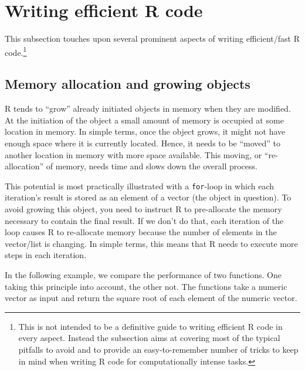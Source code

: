 \documentclass[
  12pt,
]{style/krantz}
\begin{document}
\hypertarget{writing-efficient-r-code}{%
\section{Writing efficient R code}\label{writing-efficient-r-code}}

This subsection touches upon several prominent aspects of writing efficient/fast R code.\footnote{This is not intended to be a definitive guide to writing efficient R code in every aspect. Instead the subsection aims at covering most of the typical pitfalls to avoid and to provide an easy-to-remember number of tricks to keep in mind when writing R code for computationally intense tasks.}

\hypertarget{memory-allocation-and-growing-objects}{%
\subsection{Memory allocation and growing objects}\label{memory-allocation-and-growing-objects}}

R tends to ``grow'' already initiated objects in memory when they are modified. At the initiation of the object a small amount of memory is occupied at some location in memory. In simple terms, once the object grows, it might not have enough space where it is currently located. Hence, it needs to be ``moved'' to another location in memory with more space available. This moving, or ``re-allocation'' of memory, needs time and slows down the overall process.

This potential is most practically illustrated with a \texttt{for}-loop in which each iteration's result is stored as an element of a vector (the object in question). To avoid growing this object, you need to instruct R to pre-allocate the memory necessary to contain the final result. If we don't do that, each iteration of the loop causes R to re-allocate memory because the number of elements in the vector/list is changing. In simple terms, this means that R needs to execute more steps in each iteration.

In the following example, we compare the performance of two functions. One taking this principle into account, the other not. The functions take a numeric vector as input and return the square root of each element of the numeric vector.
\end{document}
